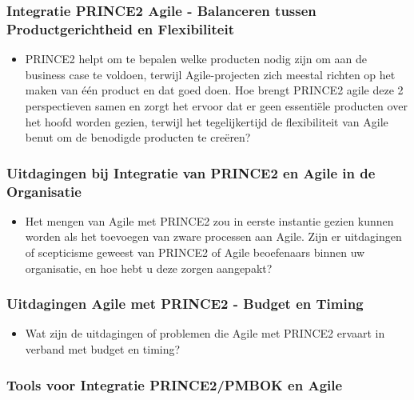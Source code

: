 \documentclass[dutch]{hogent-article}
\begin{document}
\subsubsection{Integratie PRINCE2 Agile - Balanceren tussen Productgerichtheid en Flexibiliteit}
\label{ssec:Integratie PRINCE2 Agile - Balanceren tussen Productgerichtheid en Flexibiliteit}

\begin{itemize}
    \item PRINCE2 helpt om te bepalen welke producten nodig zijn om aan de business case te voldoen, terwijl Agile-projecten zich meestal richten op het maken van één product en dat goed doen. Hoe brengt PRINCE2 agile deze 2 perspectieven samen en zorgt het ervoor dat er geen essentiële producten over het hoofd worden gezien, terwijl het tegelijkertijd de flexibiliteit van Agile benut om de benodigde producten te creëren?
\end{itemize}

\subsubsection{Uitdagingen bij Integratie van PRINCE2 en Agile in de Organisatie}
\label{ssec:Uitdagingen en Overwinningen bij Integratie van PRINCE2 en Agile in de Organisatie}

\begin{itemize}
    \item Het mengen van Agile met PRINCE2 zou in eerste instantie gezien kunnen worden als het toevoegen van zware processen aan Agile. Zijn er uitdagingen of scepticisme geweest van PRINCE2 of Agile beoefenaars binnen uw organisatie, en hoe hebt u deze zorgen aangepakt?
\end{itemize}

\subsubsection{Uitdagingen Agile met PRINCE2 - Budget en Timing}
\label{ssec:Uitdagingen Agile met PRINCE2 - Budget en Timing}

\begin{itemize}
    \item Wat zijn de uitdagingen of problemen die Agile met PRINCE2 ervaart in verband met budget en timing?
\end{itemize}

\subsubsection{Tools voor Integratie PRINCE2/PMBOK en Agile}
\label{ssec:geslaagde-en-niet-geslaagde-projecten}
\end{document}
